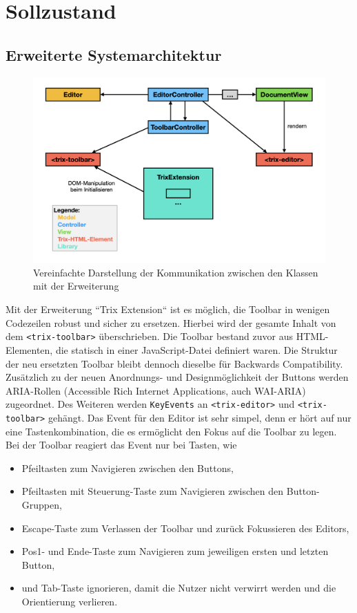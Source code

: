 \section{Sollzustand}

\subsection{Erweiterte Systemarchitektur}

\begin{figure}[H]
\begin{center}
	\includegraphics[scale=.4]{images/sysarch_extension.png}
\end{center}
	\caption{Vereinfachte Darstellung der Kommunikation zwischen den Klassen mit der Erweiterung}
\end{figure}

Mit der Erweiterung ``Trix Extension`` ist es möglich, die Toolbar in wenigen Codezeilen robust und sicher zu ersetzen. Hierbei wird der gesamte Inhalt von dem \texttt{<trix-toolbar>} überschrieben. Die Toolbar bestand zuvor aus HTML-Elementen, die statisch in einer JavaScript-Datei definiert waren. Die Struktur der neu ersetzten Toolbar bleibt dennoch dieselbe für Backwards Compatibility. Zusätzlich zu der neuen Anordnungs- und Designmöglichkeit der Buttons werden ARIA-Rollen (Accessible Rich Internet Applications, auch WAI-ARIA) zugeordnet. Des Weiteren werden \texttt{KeyEvents} an \texttt{<trix-editor>} und \texttt{<trix-toolbar>} gehängt. Das Event für den Editor ist sehr simpel, denn er hört auf nur eine Tastenkombination, die es ermöglicht den Fokus auf die Toolbar zu legen. Bei der Toolbar reagiert das Event nur bei Tasten, wie

\begin{itemize}
	\item Pfeiltasten zum Navigieren zwischen den Buttons,
	\item Pfeiltasten mit Steuerung-Taste zum Navigieren zwischen den Button-Gruppen,
	\item Escape-Taste zum Verlassen der Toolbar und zurück Fokussieren des Editors,
	\item Pos1- und Ende-Taste zum Navigieren zum jeweiligen ersten und letzten Button,
	\item und Tab-Taste ignorieren, damit die Nutzer nicht verwirrt werden und die Orientierung verlieren.
\end{itemize}

